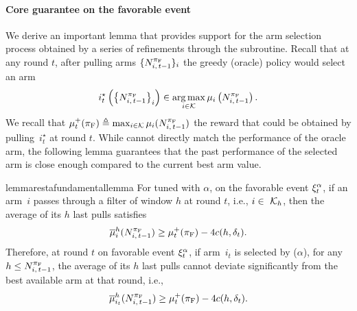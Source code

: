 \paragraph{Core guarantee on the favorable event} 
We derive an important lemma that provides support for the arm selection process obtained by a series of refinements through the \FILTER subroutine. Recall that at any round $t$, after pulling arms $\{ N_{i,\,t-1}^{\pi_{\rm F}}\}_i$ the greedy (oracle) policy would select an arm 
%
\begin{align*}
i^\star_t \left(\left\{ N_{i,\,t-1}^{\pi_{\rm F}} \right\}_i\right)  \in  \operatorname*{arg\,max}_{i \in \mathcal{K}} \mu_i \left( N_{i,\,t-1}^{\pi_{\rm F}}\right).
\end{align*}
%
We recall that $\mu^+_t(\pi_{\rm F}) \triangleq \max_{i \in \mathcal{K}} \mu_i (N_{i,\,t-1}^{\pi_{\rm F}})$ the reward that could be obtained by pulling~$i^\star_t$ at round $t$. 
While \FEWA cannot directly match the performance of the oracle arm, the following lemma guarantees that the past performance of the selected arm is close enough compared to the current best arm value. 

\begin{restatable}{lemma}{restafundamentallemma}
\label{lem:core-FEWA}
For \FEWA tuned with $\alpha$, on the favorable event $\xi^\alpha_t$, if an arm~$i$ passes through a filter of window $h$ at round $t$, i.e., $i\in\ \mathcal{K}_h$, then the average of its $h$ last pulls satisfies
%
\begin{equation}\label{eq:fundamental-eq-FEWA}
\overline{\mu}^{h}_i(N_{i,\,t-1}^{\pi_{\rm F}} ) \geq  \mu^+_t(\pi_{\rm F}) - 4 c(h, \delta_t).
\end{equation}
Therefore, at round $t$ on favorable event $\xi^\alpha_t$, if arm~$i_{t}$ is selected by \FEWA($\alpha$), for any $h \leq N_{i,\,t-1}^{\pi_{\rm F}}$,  the average of its $h$ last pulls cannot deviate significantly from the best available arm at that round, i.e.,
%
\vspace{-4pt}
\begin{equation*}
\overline{\mu}^{h}_{i_{t}}(N_{i,\,t-1}^{\pi_{\rm F}}) \geq \mu^+_t(\pi_{\rm F}) - 4 c(h, \delta_{t}).
\end{equation*}
\end{restatable}

